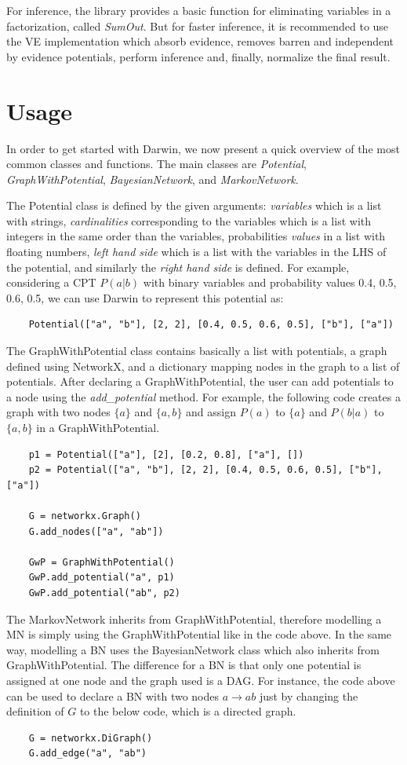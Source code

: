 For inference, the library provides a basic function for eliminating variables in a factorization, called \emph{SumOut}.
But for faster inference, it is recommended to use the VE implementation which absorb evidence, removes barren and independent by evidence potentials, perform inference and, finally, normalize the final result.

\section{Usage}
\label{sec:system:sec3}

In order to get started with Darwin, we now present a quick overview of the most common classes and functions.
The main classes are \emph{Potential}, \emph{GraphWithPotential}, \emph{BayesianNetwork}, and \emph{MarkovNetwork}.

The Potential class is defined by the given arguments: \emph{variables} which is a list with strings, \emph{cardinalities} corresponding to the variables which is a list with integers in the same order than the variables, probabilities \emph{values} in a list with floating numbers, \emph{left hand side} which is a list with the variables in the LHS of the potential, and similarly the \emph{right hand side} is defined.
For example, considering a CPT $P(a|b)$ with binary variables and probability values 0.4, 0.5, 0.6, 0.5, we can use Darwin to represent this potential as:
\begin{verbatim}
    Potential(["a", "b"], [2, 2], [0.4, 0.5, 0.6, 0.5], ["b"], ["a"])
\end{verbatim}

The GraphWithPotential class contains basically a list with potentials, a graph defined using NetworkX, and a dictionary mapping nodes in the graph to a list of potentials.
After declaring a GraphWithPotential, the user can add potentials to a node using the \emph{add\_potential} method.
For example, the following code creates a graph with two nodes $\{a\}$ and $\{a,b\}$ and assign $P(a)$ to $\{a\}$ and $P(b|a)$ to $\{a,b\}$ in a GraphWithPotential.
\begin{verbatim}
    p1 = Potential(["a"], [2], [0.2, 0.8], ["a"], [])
    p2 = Potential(["a", "b"], [2, 2], [0.4, 0.5, 0.6, 0.5], ["b"], ["a"])
    
    G = networkx.Graph()
    G.add_nodes(["a", "ab"])
    
    GwP = GraphWithPotential()
    GwP.add_potential("a", p1)
    GwP.add_potential("ab", p2)
\end{verbatim}

The MarkovNetwork inherits from GraphWithPotential, therefore modelling a MN is simply using the GraphWithPotential like in the code above.
In the same way, modelling a BN uses the BayesianNetwork class which also inherits from GraphWithPotential.
The difference for a BN is that only one potential is assigned at one node and the graph used is a DAG.
For instance, the code above can be used to declare a BN with two nodes $a \rightarrow ab$ just by changing the definition of $G$ to the below code, which is a directed graph.
\begin{verbatim}
    G = networkx.DiGraph()
    G.add_edge("a", "ab")
\end{verbatim}
